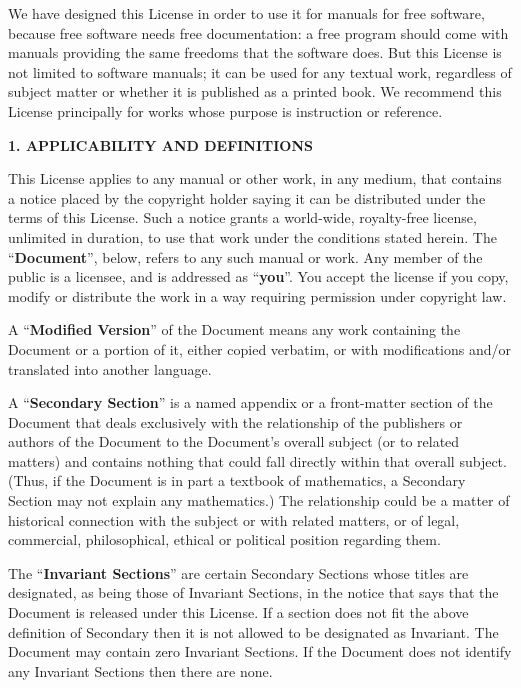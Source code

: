 \documentclass{article}
\begin{document}
	We have designed this License in order to use it for manuals for free
	software, because free software needs free documentation: a free
	program should come with manuals providing the same freedoms that the
	software does.  But this License is not limited to software manuals;
	it can be used for any textual work, regardless of subject matter or
	whether it is published as a printed book.  We recommend this License
	principally for works whose purpose is instruction or reference.
	
	
	\begin{center}
		{\Large\bf 1. APPLICABILITY AND DEFINITIONS\par}
	\end{center}
	
	This License applies to any manual or other work, in any medium, that
	contains a notice placed by the copyright holder saying it can be
	distributed under the terms of this License.  Such a notice grants a
	world-wide, royalty-free license, unlimited in duration, to use that
	work under the conditions stated herein.  The ``\textbf{Document}'', below,
	refers to any such manual or work.  Any member of the public is a
	licensee, and is addressed as ``\textbf{you}''.  You accept the license if you
	copy, modify or distribute the work in a way requiring permission
	under copyright law.
	
	A ``\textbf{Modified Version}'' of the Document means any work containing the
	Document or a portion of it, either copied verbatim, or with
	modifications and/or translated into another language.
	
	A ``\textbf{Secondary Section}'' is a named appendix or a front-matter section of
	the Document that deals exclusively with the relationship of the
	publishers or authors of the Document to the Document's overall subject
	(or to related matters) and contains nothing that could fall directly
	within that overall subject.  (Thus, if the Document is in part a
	textbook of mathematics, a Secondary Section may not explain any
	mathematics.)  The relationship could be a matter of historical
	connection with the subject or with related matters, or of legal,
	commercial, philosophical, ethical or political position regarding
	them.
	
	The ``\textbf{Invariant Sections}'' are certain Secondary Sections whose titles
	are designated, as being those of Invariant Sections, in the notice
	that says that the Document is released under this License.  If a
	section does not fit the above definition of Secondary then it is not
	allowed to be designated as Invariant.  The Document may contain zero
	Invariant Sections.  If the Document does not identify any Invariant
	Sections then there are none.
	
\end{document}
